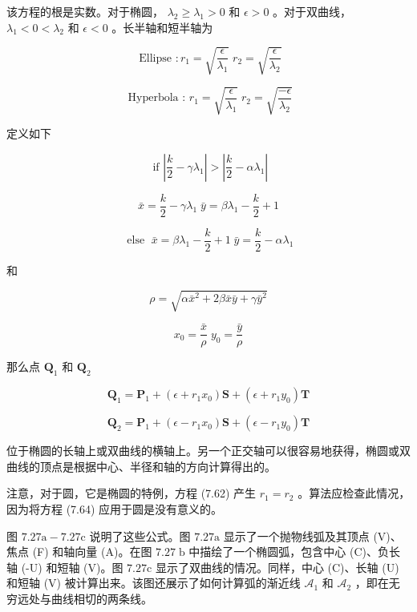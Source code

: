 \documentclass[../main.tex]{subfiles}
\begin{document}
该方程的根是实数。对于椭圆， \({\lambda }_{2} \geq  {\lambda }_{1} > 0\) 和 \(\epsilon  > 0\) 。对于双曲线， \({\lambda }_{1} < 0 < {\lambda }_{2}\) 和 \(\epsilon  < 0\) 。长半轴和短半轴为

\[
\text{ Ellipse } : {r}_{1} = \sqrt{\frac{\epsilon }{{\lambda }_{1}}}\;{r}_{2} = \sqrt{\frac{\epsilon }{{\lambda }_{2}}} \tag{7.62}
\]

\[
\text{ Hyperbola : }{r}_{1} = \sqrt{\frac{\epsilon }{{\lambda }_{1}}}\;{r}_{2} = \sqrt{\frac{-\epsilon }{{\lambda }_{2}}} \tag{7.63}
\]

定义如下

\[
\text{ if }\left| {\frac{k}{2} - \gamma {\lambda }_{1}}\right|  > \left| {\frac{k}{2} - \alpha {\lambda }_{1}}\right|
\]

\[
\bar{x} = \frac{k}{2} - \gamma {\lambda }_{1}\;\bar{y} = \beta {\lambda }_{1} - \frac{k}{2} + 1
\]

\[
\text{ else }\;\bar{x} = \beta {\lambda }_{1} - \frac{k}{2} + 1\;\bar{y} = \frac{k}{2} - \alpha {\lambda }_{1}
\]

和

\[
\rho = \sqrt{\alpha {\bar{x}}^{2} + {2\beta }\bar{x}\bar{y} + \gamma {\bar{y}}^{2}}
\]

\[
{x}_{0} = \frac{\bar{x}}{\rho }\;{y}_{0} = \frac{\bar{y}}{\rho }
\]

那么点 \({\mathbf{Q}}_{1}\) 和 \({\mathbf{Q}}_{2}\)

\[
{\mathbf{Q}}_{1} = {\mathbf{P}}_{1} + \left( {\epsilon  + {r}_{1}{x}_{0}}\right) \mathbf{S} + \left( {\epsilon  + {r}_{1}{y}_{0}}\right) \mathbf{T}
\]

\[
{\mathbf{Q}}_{2} = {\mathbf{P}}_{1} + \left( {\epsilon  - {r}_{1}{x}_{0}}\right) \mathbf{S} + \left( {\epsilon  - {r}_{1}{y}_{0}}\right) \mathbf{T} \tag{7.64}
\]

位于椭圆的长轴上或双曲线的横轴上。另一个正交轴可以很容易地获得，椭圆或双曲线的顶点是根据中心、半径和轴的方向计算得出的。

注意，对于圆，它是椭圆的特例，方程 (7.62) 产生 \({r}_{1} = {r}_{2}\) 。算法应检查此情况，因为将方程 (7.64) 应用于圆是没有意义的。

图 \({7.27}\mathrm{a} - {7.27}\mathrm{c}\) 说明了这些公式。图 \({7.27}\mathrm{a}\) 显示了一个抛物线弧及其顶点 (V)、焦点 (F) 和轴向量 (A)。在图 \({7.27}\mathrm{\;b}\) 中描绘了一个椭圆弧，包含中心 (C)、负长轴 (-U) 和短轴 (V)。图 \({7.27}\mathrm{c}\) 显示了双曲线的情况。同样，中心 (C)、长轴 (U) 和短轴 (V) 被计算出来。该图还展示了如何计算弧的渐近线 \({\mathcal{A}}_{1}\) 和 \({\mathcal{A}}_{2}\) ，即在无穷远处与曲线相切的两条线。
\end{document}
